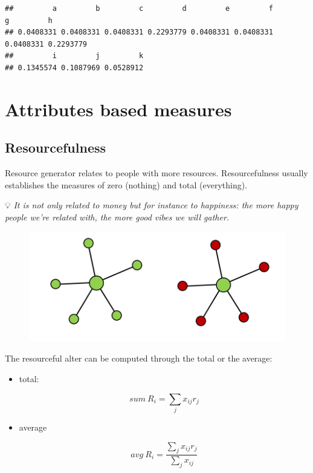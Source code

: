 \documentclass[
  notitlepage,
  onecolumn,
  openany]{book}
\begin{document}
\begin{verbatim}
##         a         b         c         d         e         f         g         h 
## 0.0408331 0.0408331 0.0408331 0.2293779 0.0408331 0.0408331 0.0408331 0.2293779 
##         i         j         k 
## 0.1345574 0.1087969 0.0528912
\end{verbatim}

\hypertarget{attributes-based-measures}{%
\chapter{Attributes based measures}\label{attributes-based-measures}}

\hypertarget{resourcefulness}{%
\section{Resourcefulness}\label{resourcefulness}}

Resource generator relates to people with more resources. Resourcefulness usually establishes the measures of zero (nothing) and total (everything).

💡 \emph{It is not only related to money but for instance to happiness: the more happy people we're related with, the more good vibes we will gather.}

\begin{figure}[h!]

{\centering \includegraphics[width=0.5\linewidth]{images/06-Attributes based measures/Untitled} 

}

\end{figure}

The resourceful alter can be computed through the total or the average:

\begin{itemize}
\item
  total:

  \[
    sum \ R_i = \sum_j x_{ij}r_j
    \]
\item
  average

  \[
    avg \ R_i = \frac{ \sum_j x_{ij}r_j}{\sum_j x_{ij}}
    \]
\end{itemize}
\end{document}
